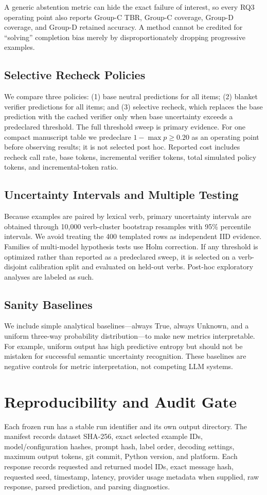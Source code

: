\documentclass[letterpaper]{article}
\begin{document}
A generic abstention metric can hide the exact failure of interest, so every RQ3 operating point also reports Group-C TBR, Group-C coverage, Group-D coverage, and Group-D retained accuracy. A method cannot be credited for ``solving'' completion bias merely by disproportionately dropping progressive examples.

\subsection{Selective Recheck Policies}
We compare three policies: (1) base neutral predictions for all items; (2) blanket verifier predictions for all items; and (3) selective recheck, which replaces the base prediction with the cached verifier only when base uncertainty exceeds a predeclared threshold. The full threshold sweep is primary evidence. For one compact manuscript table we predeclare $1-\max p\ge0.20$ as an operating point before observing results; it is not selected post hoc. Reported cost includes recheck call rate, base tokens, incremental verifier tokens, total simulated policy tokens, and incremental-token ratio.

\subsection{Uncertainty Intervals and Multiple Testing}
Because examples are paired by lexical verb, primary uncertainty intervals are obtained through 10,000 verb-cluster bootstrap resamples with 95\% percentile intervals. We avoid treating the 400 templated rows as independent IID evidence. Families of multi-model hypothesis tests use Holm correction. If any threshold is optimized rather than reported as a predeclared sweep, it is selected on a verb-disjoint calibration split and evaluated on held-out verbs. Post-hoc exploratory analyses are labeled as such.

\subsection{Sanity Baselines}
We include simple analytical baselines---always True, always Unknown, and a uniform three-way probability distribution---to make new metrics interpretable. For example, uniform output has high predictive entropy but should not be mistaken for successful semantic uncertainty recognition. These baselines are negative controls for metric interpretation, not competing LLM systems.

\section{Reproducibility and Audit Gate}
Each frozen run has a stable run identifier and its own output directory. The manifest records dataset SHA-256, exact selected example IDs, model/configuration hashes, prompt hash, label order, decoding settings, maximum output tokens, git commit, Python version, and platform. Each response records requested and returned model IDs, exact message hash, requested seed, timestamp, latency, provider usage metadata when supplied, raw response, parsed prediction, and parsing diagnostics.
\end{document}
